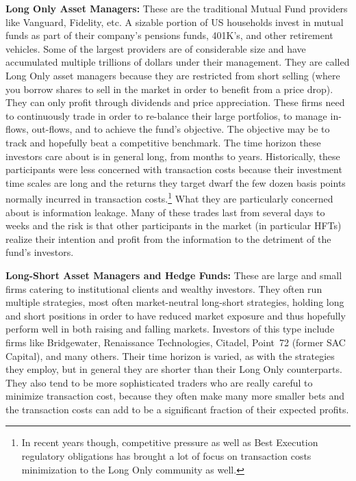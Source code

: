 \noindent\textbf{Long Only Asset Managers:} These are the traditional Mutual Fund providers like Vanguard, Fidelity, etc. A sizable portion of US households invest in mutual funds as part of their company's pensions funds, 401K's, and other retirement vehicles. Some of the largest providers are of considerable size and have accumulated multiple trillions of dollars under their management. They are called Long Only asset managers because they are restricted from short selling (where you borrow shares to sell in the market in order to benefit from a price drop). They can only profit through dividends and price appreciation. These firms need to continuously trade in order to re-balance their large portfolios, to manage in-flows, out-flows, and to achieve the fund's objective. The objective may be to track and hopefully beat a competitive benchmark. The time horizon these investors care about is in general long, from months to years. Historically, these participants were less concerned with transaction costs because their investment time scales are long and the returns they target dwarf the few dozen basis points normally incurred in transaction costs.\footnote{In recent years though, competitive pressure as well as Best Execution regulatory obligations has brought a lot of focus on transaction costs minimization to the Long Only community as well.} What they are particularly concerned about is information leakage. Many of these trades last from several days to weeks and the risk is that other participants in the market (in particular HFTs) realize their intention and profit from the information to the detriment of the fund's investors. \twomedskip


\noindent\textbf{Long-Short Asset Managers and Hedge Funds:} These are large and small firms catering to institutional clients and wealthy investors. They often run multiple strategies, most often market-neutral long-short strategies, holding long and short positions in order to have reduced market exposure and  thus hopefully perform well in both raising and falling markets. Investors of this type include firms like Bridgewater, Renaissance Technologies, Citadel, Point~72 (former SAC Capital), and many others. Their time horizon is varied, as with the strategies they employ, but in general they are shorter than their Long Only counterparts. They also tend to be more sophisticated traders who are really careful to minimize transaction cost, because they often make many more smaller bets and the transaction costs can add to be a significant fraction of their expected profits. \twomedskip



